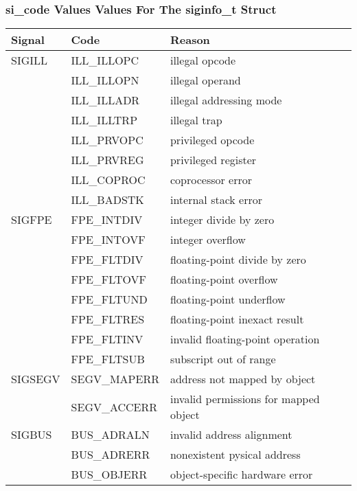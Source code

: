 \documentclass{article}
\begin{document}
\subsubsection{\textbf{si\_code} Values Values For The siginfo\_t Struct}
\begin{table}[h!]
    \begin{center}
        \begin{tabular}{|l|l|l|}
            \hline
Signal      & Code             & Reason \\
            \hline
SIGILL      & ILL\_ILLOPC      & illegal opcode \\
            & ILL\_ILLOPN      & illegal operand \\
            & ILL\_ILLADR      & illegal addressing mode  \\
            & ILL\_ILLTRP      & illegal trap \\
            & ILL\_PRVOPC      & privileged opcode \\
            & ILL\_PRVREG      & privileged register \\
            & ILL\_COPROC      & coprocessor error \\
            & ILL\_BADSTK      & internal stack error \\
            \hline
SIGFPE      & FPE\_INTDIV      & integer divide by zero \\
            & FPE\_INTOVF      & integer overflow \\
            & FPE\_FLTDIV      & floating-point divide by zero \\
            & FPE\_FLTOVF      & floating-point overflow \\
            & FPE\_FLTUND      & floating-point underflow \\
            & FPE\_FLTRES      & floating-point inexact result \\
            & FPE\_FLTINV      & invalid floating-point operation \\
            & FPE\_FLTSUB      & subscript out of range \\
            \hline
SIGSEGV     & SEGV\_MAPERR     & address not mapped by object \\
            & SEGV\_ACCERR     & invalid permissions for mapped object \\
            \hline
SIGBUS      & BUS\_ADRALN      & invalid address alignment \\
            & BUS\_ADRERR      & nonexistent pysical address \\
            & BUS\_OBJERR      & object-specific hardware error \\

\end{tabular}
\end{center}
\end{table}
\end{document}
